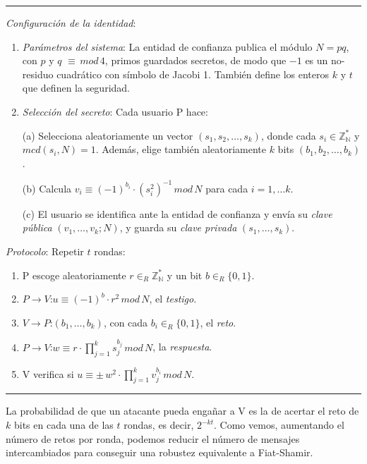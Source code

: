 \rule{\textwidth}{1pt}
\begin{algorithm}
	\hfil
	
	\textit{Configuración de la identidad}:
	\begin{enumerate}
		\item \textit{Parámetros del sistema}: La entidad de confianza publica el módulo $N=pq$, con $p$ y $q$ $\equiv \, mod \, 4$, primos guardados secretos, de modo que $-1$ es un no-residuo cuadrático con símbolo de Jacobi 1. También define los enteros $k$ y $t$ que definen la seguridad.
		
		\item \textit{Selección del secreto}: Cada usuario P hace:
		
		\subitem (a) Selecciona aleatoriamente un vector $(s_1,s_2,\dots ,s_k)$, donde cada  $s_i \in \mathbb{Z_N^*}$ y $mcd(s_i, N)=1$. Además, elige también aleatoriamente $k$ bits $(b_1, b_2, \dots , b_k)$.
		
		\subitem (b) Calcula $v_i \equiv (-1)^{b_i}\cdot (s_i^2)^{-1} \, mod \, N$ para cada $i=1,\dots k$.
		
		\subitem (c) El usuario se identifica ante la entidad de confianza y envía su \textit{clave pública} $(v_1,\dots , v_k; N)$, y guarda su \textit{clave privada} $(s_1, \dots , s_k)$.
		
	\end{enumerate}
	
	
	\textit{Protocolo}: Repetir $t$ rondas:
	\begin{enumerate}
		\item P escoge aleatoriamente $r \in_R \mathbb{Z_N^*}$ y un bit $b \in_R \{0,1\}$.
		\item $P \rightarrow V$:\quad $u \equiv (-1)^b \cdot r^2 \, mod \, N$, el \textit{testigo}.
		\item $V \rightarrow P$:\quad $(b_1,\dots ,b_k)$, con cada $b_i \in_R \{0,1\}$, el \textit{reto}.
		\item $P \rightarrow V$:\quad $w \equiv r\cdot \prod_{j=1}^{k} s_j^{b_j} \, mod \, N$, la \textit{respuesta}.
		\item V verifica si \quad $ u \equiv \pm \, w^2 \cdot \prod_{j=1}^{k} v_j^{b_i} \, mod \, N$.
	\end{enumerate}
	
\end{algorithm}
\rule{\textwidth}{1pt}

La probabilidad de que un atacante pueda engañar a V es la de acertar el reto de $k$ bits en cada una de las $t$ rondas, es decir, $2^{-kt}$. Como vemos, aumentando el número de retos por ronda, podemos reducir el número de mensajes intercambiados para conseguir una robustez equivalente a Fiat-Shamir.



